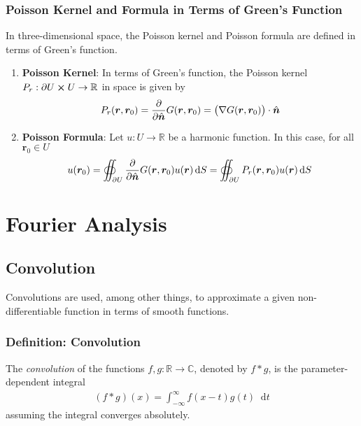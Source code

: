 \documentclass[11pt, a4paper]{article}
\newcommand{\diff}{\mathop{}\!\mathrm{d}} %
\renewcommand{\vec}[1]{\bm{#1}}
\newcommand{\uvec}[1]{\hat{\vec{#1}}}
\renewcommand{\grad}{\nabla}
\newcommand{\R}{\mathbb{R}} %
\newcommand{\C}{\mathbb{C}} %
\begin{document}
\subsubsection{Poisson Kernel and Formula in Terms of Green's Function}
In three-dimensional space, the Poisson kernel and Poisson formula are defined in terms of Green's function. 
\begin{enumerate}
	\item \textbf{Poisson Kernel}: In terms of Green's function, the Poisson kernel $ P_r : \partial U \cross U \to  \R $ in space is given by
	\begin{align*}
		P_r(\bm{r}, \bm{r}_0) = \pdv{}{\uvec{n}} G(\bm{r}, \bm{r}_0)  = \big(\grad{G(\bm{r}, \bm{r}_0)} \big)\cdot \uvec{n}
	\end{align*}
	
	\item \textbf{Poisson Formula}: Let $ u : U \to \R $ be a  harmonic function. In this case, for all $ \bm{r}_0 \in U $
	\begin{align*}
		u(\bm{r}_0) = \oiint_{\partial U} \pdv{}{\uvec{n}} G(\bm{r}, \bm{r}_0) u(\bm{r}) \diff S = \oiint_{\partial U} P_r(\bm{r}, \bm{r}_0) u(\bm{r}) \diff S
	\end{align*}

\end{enumerate}

\newpage

\section{Fourier Analysis}

\subsection{Convolution}
Convolutions are used, among other things, to approximate a given non-differentiable function in terms of smooth functions.

\subsubsection{Definition: Convolution}
The \textit{convolution} of the functions $ f, g: \R \to \C $, denoted by $ f * g $, is the parameter-dependent integral
\begin{align*}
	(f*g)(x) = \int_{-\infty}^{\infty}f(x-t)g(t)\diff t
\end{align*}
assuming the integral converges absolutely.
\end{document}
